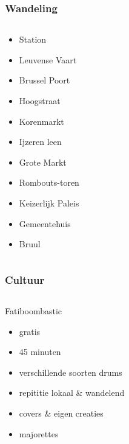 \documentclass{beamer}
\begin{document}
\begin{frame}
\frametitle{Wandeling}
\begin{columns}[c]
\begin{block}{}
\begin{itemize}
\item Station
\item Leuvense Vaart
\item Brussel Poort
\item Hoogstraat
\item Korenmarkt
\item Ijzeren leen
\item Grote Markt
\item Rombouts-toren
\item Keizerlijk Paleis
\item Gemeentehuis
\item Bruul
\end{itemize}
\end{block}
\end{columns}
\end{frame}


\begin{frame}
\frametitle{Cultuur}
\begin{columns}[c]
\begin{block}{Fatiboombastic}
\begin{itemize}
\item gratis
\item 45 minuten
\item verschillende soorten drums
\item repititie lokaal \& wandelend
\item covers \& eigen creaties
\item majorettes
\end{itemize}
\end{block}
\end{columns}
\end{frame}
\end{document}
